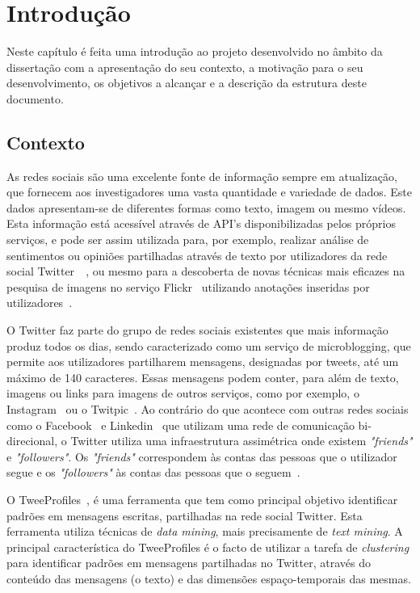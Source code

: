 \chapter{Introdução} \label{chap:intro}

Neste capítulo é feita uma introdução ao projeto desenvolvido no âmbito da dissertação com a apresentação do seu contexto, a motivação para o seu desenvolvimento, os objetivos a alcançar e a descrição da estrutura deste documento.

\section{Contexto}

As redes sociais são uma excelente fonte de informação sempre em atualização, que fornecem aos investigadores uma vasta quantidade e variedade de dados. Este dados apresentam-se de diferentes formas como texto, imagem ou mesmo  vídeos. Esta informação está acessível através de API's disponibilizadas pelos próprios serviços, e pode ser assim utilizada para, por exemplo, realizar análise de sentimentos ou opiniões partilhadas através de texto por utilizadores da rede social Twitter~\cite{Pak2010}~\cite{twitter}, ou mesmo para a descoberta de novas técnicas mais eficazes na pesquisa de imagens no serviço Flickr~\cite{flickr} utilizando anotações inseridas por utilizadores~\cite{Li2008}.  

O Twitter faz parte do grupo de redes sociais existentes que mais informação produz todos os dias, sendo caracterizado como um serviço de microblogging, que permite aos utilizadores partilharem mensagens, designadas por tweets, até um máximo de 140 caracteres. Essas mensagens podem conter, para além de texto, imagens ou links para imagens de outros serviços, como por exemplo, o Instagram~\cite{instagram} ou o Twitpic~\cite{twitpic}. Ao contrário do que acontece com outras redes sociais como o Facebook~\cite{facebook} e Linkedin~\cite{linkedin} que utilizam uma rede de comunicação bi-direcional, o Twitter utiliza uma infraestrutura assimétrica onde existem \textit{"friends"} e \textit{"followers"}. Os \textit{"friends"} correspondem às contas das pessoas que o utilizador segue e os \textit{"followers"} às contas das pessoas que o seguem~\citet{Russell2011}.

O TweeProfiles~\citet{Cunha2013}, é uma ferramenta que tem como principal objetivo identificar padrões em mensagens escritas, partilhadas na rede social Twitter. Esta ferramenta utiliza técnicas de \textit{data mining}, mais precisamente de \textit{text mining}. A principal característica do TweeProfiles é o facto de utilizar a tarefa de \textit{clustering} para identificar padrões em mensagens partilhadas no Twitter, através do conteúdo das mensagens (o texto) e das dimensões espaço-temporais das mesmas. 

